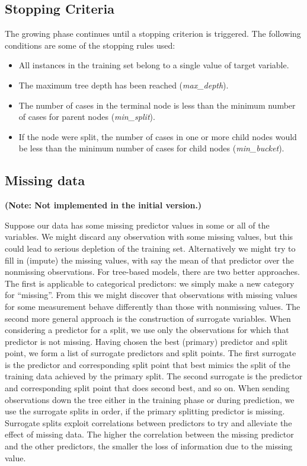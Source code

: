\subsection{Stopping Criteria} %
\label{sub:stopping_criteria}
The growing phase continues until a stopping criterion is triggered.
The following conditions are some of the stopping rules used:
\begin{itemize}
    \item All instances in the training set belong to a single value of target variable.
    \item The maximum tree depth has been reached (\emph{max\_depth}).
    \item The number of cases in the terminal node is less than the minimum
    number of cases for parent nodes (\emph{min\_split}).
    \item If the node were split, the number of cases in one or more child nodes
    would be less than the minimum number of cases for child nodes (\emph{min\_bucket}).
\end{itemize}

\subsection{Missing data} %
\label{sub:missing_predictor_data}
\textbf{(Note: Not implemented in the initial version.)}

Suppose our data has some missing predictor values in some or all of the
variables. We might discard any observation with some missing values, but this
could lead to serious depletion of the training set. Alternatively we might try
to fill in (impute) the missing values, with say the mean of that predictor over
the nonmissing observations. For tree-based models, there are two better
approaches. The first is applicable to categorical predictors: we simply make a
new category for ``missing''. From this we might discover that observations with
missing values for some measurement behave differently than those with
non\-missing values. The second more general approach is the construction of
surrogate variables. When considering a predictor for a split, we use only the
observations for which that predictor is not missing. Having chosen the best
(primary) predictor and split point, we form a list of surrogate predictors and
split points. The first surrogate is the predictor and corresponding split point
that best mimics the split of the training data achieved by the primary split.
The second surrogate is the predictor and corresponding split point that does
second best, and so on. When sending observations down the tree either in the
training phase or during prediction, we use the surrogate splits in order, if
the primary splitting predictor is missing. Surrogate splits exploit
correlations between predictors to try and alleviate the effect of missing data.
The higher the correlation between the missing predictor and the other
predictors, the smaller the loss of information due to the missing value.


